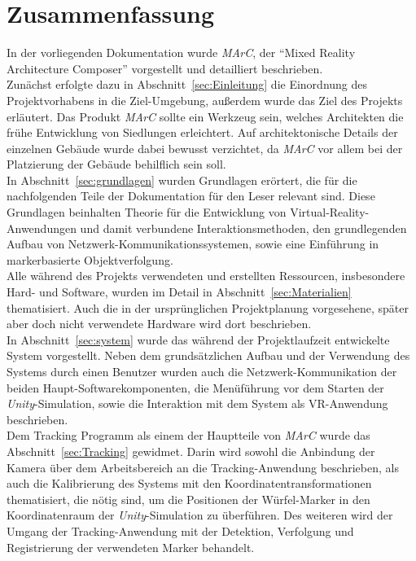 \section{Zusammenfassung}%
In der vorliegenden Dokumentation wurde \emph{MArC}, der "`Mixed Reality Architecture Composer"' vorgestellt und detailliert beschrieben.\\
Zunächst erfolgte dazu in Abschnitt~\ref{sec:Einleitung} die Einordnung des Projektvorhabens in die Ziel-Umgebung, außerdem wurde das Ziel des Projekts erläutert. Das Produkt \emph{MArC} sollte ein Werkzeug sein, welches Architekten die frühe Entwicklung von Siedlungen erleichtert. Auf architektonische Details der einzelnen Gebäude wurde dabei bewusst verzichtet, da \emph{MArC} vor allem bei der Platzierung der Gebäude behilflich sein soll.\\
In Abschnitt~\ref{sec:grundlagen} wurden Grundlagen erörtert, die für die nachfolgenden Teile der Dokumentation für den Leser relevant sind. Diese Grundlagen beinhalten Theorie für die Entwicklung von Virtual-Reality-Anwendungen und damit verbundene Interaktionsmethoden, den grundlegenden Aufbau von Netz\-werk-Kom\-mu\-ni\-ka\-tions\-systemen, sowie eine Einführung in markerbasierte Objektverfolgung.\\
Alle während des Projekts verwendeten und erstellten Ressourcen, insbesondere Hard- und Software, wurden im Detail in Abschnitt~\ref{sec:Materialien} thematisiert. Auch die in der ursprünglichen Projektplanung vorgesehene, später aber doch nicht verwendete Hardware wird dort beschrieben.\\
In Abschnitt~\ref{sec:system} wurde das während der Projektlaufzeit entwickelte System vorgestellt. Neben dem grundsätzlichen Aufbau und der Verwendung des Systems durch einen Benutzer wurden auch die Netz\-werk-Kom\-mu\-ni\-ka\-tion der beiden Haupt-Soft\-ware\-kom\-po\-nen\-ten, die Menüführung vor dem Starten der \emph{Unity}-Simulation, sowie die Interaktion mit dem System als VR-Anwendung beschrieben.\\
Dem Tracking Programm als einem der Hauptteile von \emph{MArC} wurde das Abschnitt~\ref{sec:Tracking} gewidmet. Darin wird sowohl die Anbindung der Kamera über dem Arbeitsbereich an die Tracking-Anwendung beschrieben, als auch die Kalibrierung des Systems mit den Koordinatentransformationen thematisiert, die nötig sind, um die Positionen der Würfel-Marker in den Koordinatenraum der \emph{Unity}-Simulation zu überführen. Des weiteren wird der Umgang der Tracking-Anwendung mit der Detektion, Verfolgung und Registrierung der verwendeten Marker behandelt.\\
